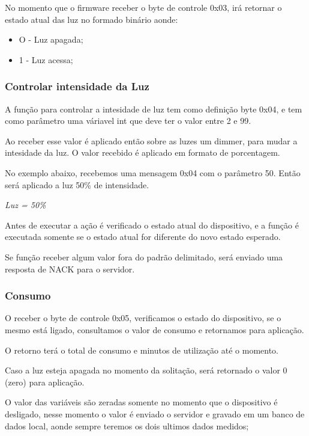 \documentclass[openright]{normas-utf-tex} %
\begin{document}
No momento que o firmware receber o byte de controle 0x03, irá retornar o estado atual das luz no formado binário aonde:

\begin{itemize}
    \item O - Luz apagada;
    \item 1 - Luz acessa;
\end{itemize}

\subsubsection{Controlar intensidade da Luz}
A função para controlar a intesidade de luz tem como definição byte 0x04, e tem como parâmetro uma váriavel int que deve ter o valor entre 2 e 99.

Ao receber esse valor é aplicado então sobre as luzes um dimmer, para mudar a intesidade da luz. O valor recebido é aplicado em formato de porcentagem.

No exemplo abaixo, recebemos uma mensagem 0x04 com o parâmetro 50. Então será aplicado a luz 50\% de intensidade.

\begin{center}
    \textit{
    Luz =  50\%
    }
\end{center}

Antes de executar a ação é verificado o estado atual do dispositivo, e a função é executada somente se o estado atual for diferente do novo estado esperado.

Se função receber algum valor fora do padrão delimitado, será enviado uma resposta de NACK para o servidor.

\subsubsection{Consumo}
O receber o byte de controle 0x05, verificamos o estado do dispositivo, se o mesmo está ligado, consultamos o valor de consumo e retornamos para aplicação.

O retorno terá o total de consumo e minutos de utilização até o momento.

Caso a luz esteja apagada no momento da solitação, será retornado o valor 0 (zero) para aplicação.

O valor das variáveis são zeradas somente no momento que o dispositivo é desligado, nesse momento o valor é enviado o servidor e gravado em um banco de dados local, aonde sempre teremos os dois ultimos dados medidos;
\end{document}
